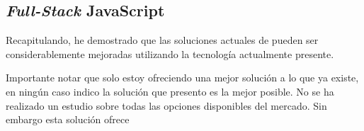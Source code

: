 \subsection{ \textit{Full-Stack} JavaScript }
	



Recapitulando, he demostrado que las soluciones actuales de \ecommerce pueden ser considerablemente mejoradas utilizando la tecnología actualmente presente.

Importante notar que solo estoy ofreciendo una mejor solución a lo que ya existe, en ningún caso indico la solución que presento es la mejor posible. No se ha realizado un estudio sobre todas las opciones disponibles del mercado. Sin embargo esta solución ofrece

